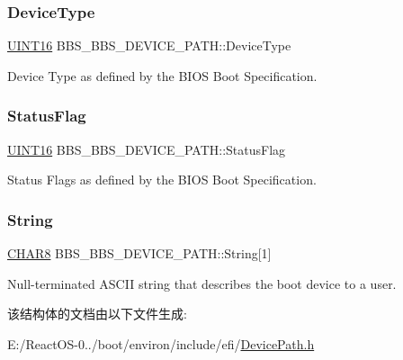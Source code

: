 \subsubsection{\texorpdfstring{Device\+Type}{DeviceType}}
{\footnotesize\ttfamily \hyperlink{_processor_bind_8h_a09f1a1fb2293e33483cc8d44aefb1eb1}{U\+I\+N\+T16} B\+B\+S\+\_\+\+B\+B\+S\+\_\+\+D\+E\+V\+I\+C\+E\+\_\+\+P\+A\+T\+H\+::\+Device\+Type}

Device Type as defined by the B\+I\+OS Boot Specification. \mbox{\label{struct_b_b_s___b_b_s___d_e_v_i_c_e___p_a_t_h_ad4b38c52e35b54f1c29c743d22d38909}} 
\subsubsection{\texorpdfstring{Status\+Flag}{StatusFlag}}
{\footnotesize\ttfamily \hyperlink{_processor_bind_8h_a09f1a1fb2293e33483cc8d44aefb1eb1}{U\+I\+N\+T16} B\+B\+S\+\_\+\+B\+B\+S\+\_\+\+D\+E\+V\+I\+C\+E\+\_\+\+P\+A\+T\+H\+::\+Status\+Flag}

Status Flags as defined by the B\+I\+OS Boot Specification. \mbox{\label{struct_b_b_s___b_b_s___d_e_v_i_c_e___p_a_t_h_a5977376aa9cef19ecb972b1119bc5d0e}} 
\subsubsection{\texorpdfstring{String}{String}}
{\footnotesize\ttfamily \hyperlink{_processor_bind_8h_a86fec2d8279568b834836c4ba2b80574}{C\+H\+A\+R8} B\+B\+S\+\_\+\+B\+B\+S\+\_\+\+D\+E\+V\+I\+C\+E\+\_\+\+P\+A\+T\+H\+::\+String\mbox{[}1\mbox{]}}

Null-\/terminated A\+S\+C\+II string that describes the boot device to a user. 

该结构体的文档由以下文件生成\+:\begin{DoxyCompactItemize}
\item 
E\+:/\+React\+O\+S-\/0../boot/environ/include/efi/\hyperlink{_device_path_8h}{Device\+Path.\+h}\end{DoxyCompactItemize}
